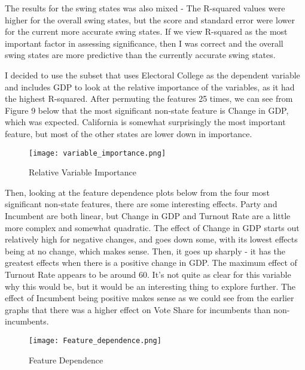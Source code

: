 \documentclass[12pt]{article}
\begin{document}
\vspace{3.00mm}

The results for the swing states was also mixed - The R-squared values were higher for the overall swing states, but the score and standard error were lower for the current more accurate swing states. If we view R-squared as the most important factor in assessing significance, then I was correct and the overall swing states are more predictive than the currently accurate swing states.

\vspace{3.00mm}

I decided to use the subset that uses Electoral College as the dependent variable and includes GDP to look at the relative importance of the variables, as it had the highest R-squared. After permuting the features 25 times, we can see from Figure 9 below that the most significant non-state feature is Change in GDP, which was expected. California is somewhat surprisingly the most important feature, but most of the other states are lower down in importance.

\begin{figure}[H]
    \centering
    \texttt{[image: variable\_importance.png]}
    \caption{Relative Variable Importance}
\end{figure}

Then, looking at the feature dependence plots below from the four most significant non-state features, there are some interesting effects. Party and Incumbent are both linear, but Change in GDP and Turnout Rate are a little more complex and somewhat quadratic. The effect of Change in GDP starts out relatively high for negative changes, and goes down some, with its lowest effects being at no change, which makes sense. Then, it goes up sharply - it has the greatest effects when there is a positive change in GDP. The maximum effect of Turnout Rate appears to be around 60. It's not quite as clear for this variable why this would be, but it would be an interesting thing to explore further. The effect of Incumbent being positive makes sense as we could see from the earlier graphs that there was a higher effect on Vote Share for incumbents than non-incumbents.

\begin{figure}[H]
    \centering
    \texttt{[image: Feature\_dependence.png]}
    \caption{Feature Dependence}
\end{figure}

\vspace{3.00mm}
\end{document}
